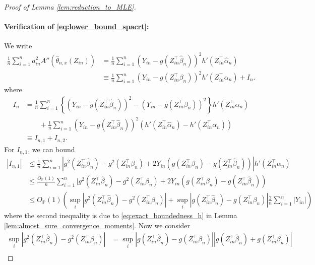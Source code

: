 \documentclass[12pt]{article}
\theoremstyle{definition}
\def\P{\mathbb{P}}
\def\P{\mathbb{P}}
\renewcommand{\P}{\mathbb{P}}							%
\newcommand{\srz}{Z}									%
\newcommand{\sry}{Y}									%
\begin{document}
\begin{proof}[Proof of Lemma \ref{lem:reduction_to_MLE}]
    \paragraph{Verification of \eqref{eq:lower_bound_spacrt}:}

    We write 
    \begin{align*}
      \frac{1}{n}\sum_{i=1}^n a_{in}^2A''(\widehat \theta_{n,x}(\srz_{in}))
      &
      =\frac{1}{n}\sum_{i=1}^n (\sry_{in}-g(\srz_{in}^\top\widehat\beta_n))^2h'(\srz_{in}^\top \widehat{\alpha}_n)\\
      &
      \equiv \frac{1}{n}\sum_{i=1}^n (\sry_{in}-g(\srz_{in}^\top \beta_n))^2h'(\srz_{in}^\top \alpha_n)+I_n.
    \end{align*}
    where 
    \begin{align*}
      I_n
      &
      =\frac{1}{n}\sum_{i=1}^n \left\{(\sry_{in}-g(\srz_{in}^\top \widehat\beta_n))^2-(\sry_{in}-g(\srz_{in}^\top \beta_n))^2\right\}h'(\srz_{in}^\top \alpha_n)\\
      &
      \qquad + \frac{1}{n}\sum_{i=1}^n (\sry_{in}-g(\srz_{in}^\top \widehat\beta_n))^2(h'(\srz_{in}^\top\widehat{\alpha}_n)-h'(\srz_{in}^\top\alpha_n))\\
      &
      \equiv I_{n,1}+I_{n,2}.
    \end{align*}
    For $I_{n,1}$, we can bound 
    \begin{align*}
      |I_{n,1}|
      &
      \leq \frac{1}{n}\sum_{i=1}^n |g^2(\srz_{in}^\top\widehat{\beta}_n)-g^2(\srz_{in}^\top\beta_n)+2Y_{in}(g(\srz_{in}^\top\beta_n)-g(\srz_{in}^\top\widehat{\beta}_n))|h'(\srz_{in}^\top \alpha_n)\\
      &
      \leq \frac{O_{\P}(1)}{n}\sum_{i=1}^n |g^2(\srz_{in}^\top\widehat{\beta}_n)-g^2(\srz_{in}^\top\beta_n)+2Y_{in}(g(\srz_{in}^\top\beta_n)-g(\srz_{in}^\top\widehat{\beta}_n))\\
      &
      \leq O_{\P}(1)\left(\sup_i|g^2(\srz_{in}^\top\widehat{\beta}_n)-g^2(\srz_{in}^\top\beta_n)|+\sup_{i}|g(\srz_{in}^\top\widehat{\beta}_n)-g(\srz_{in}^\top\beta_n)|\frac{2}{n}\sum_{i=1}^n |Y_{in}|\right)
    \end{align*}
    where the second inequality is due to \eqref{eq:exact_boundedness_h} in Lemma \ref{lem:almost_sure_convergence_moments}. Now we consider
    \begin{align*}
      \sup_i|g^2(\srz_{in}^\top\widehat{\beta}_n)-g^2(\srz_{in}^\top\beta_n)|
      &
      =\sup_i|g(\srz_{in}^\top\widehat{\beta}_n)-g(\srz_{in}^\top\beta_n)||g(\srz_{in}^\top\widehat{\beta}_n)+g(\srz_{in}^\top\beta_n)|\\

\end{align*}
\end{proof}
\end{document}
